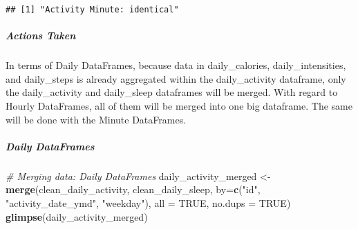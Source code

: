 \documentclass[
]{article}
\newenvironment{Shaded}{\begin{snugshade}}{\end{snugshade}}
\newcommand{\AttributeTok}[1]{\textcolor[rgb]{0.13,0.29,0.53}{#1}}
\newcommand{\CommentTok}[1]{\textcolor[rgb]{0.56,0.35,0.01}{\textit{#1}}}
\newcommand{\ConstantTok}[1]{\textcolor[rgb]{0.56,0.35,0.01}{#1}}
\newcommand{\FunctionTok}[1]{\textcolor[rgb]{0.13,0.29,0.53}{\textbf{#1}}}
\newcommand{\NormalTok}[1]{#1}
\newcommand{\OtherTok}[1]{\textcolor[rgb]{0.56,0.35,0.01}{#1}}
\newcommand{\StringTok}[1]{\textcolor[rgb]{0.31,0.60,0.02}{#1}}
\begin{document}
\begin{verbatim}
## [1] "Activity Minute: identical"
\end{verbatim}

\hypertarget{actions-taken-1}{%
\subparagraph{Actions Taken}\label{actions-taken-1}}

In terms of Daily DataFrames, because data in daily\_calories,
daily\_intensities, and daily\_steps is already aggregated within the
daily\_activity dataframe, only the daily\_activity and daily\_sleep
dataframes will be merged. With regard to Hourly DataFrames, all of them
will be merged into one big dataframe. The same will be done with the
Minute DataFrames.

\hypertarget{daily-dataframes-7}{%
\subparagraph{Daily DataFrames}\label{daily-dataframes-7}}

\begin{Shaded}
\begin{Highlighting}[]
\CommentTok{\# Merging data: Daily DataFrames}
\NormalTok{daily\_activity\_merged }\OtherTok{\textless{}{-}} \FunctionTok{merge}\NormalTok{(clean\_daily\_activity, clean\_daily\_sleep, }\AttributeTok{by=}\FunctionTok{c}\NormalTok{(}\StringTok{"id"}\NormalTok{, }\StringTok{"activity\_date\_ymd"}\NormalTok{, }\StringTok{"weekday"}\NormalTok{), }\AttributeTok{all =} \ConstantTok{TRUE}\NormalTok{, }\AttributeTok{no.dups =} \ConstantTok{TRUE}\NormalTok{)}
\FunctionTok{glimpse}\NormalTok{(daily\_activity\_merged)}
\end{Highlighting}
\end{Shaded}
\end{document}
